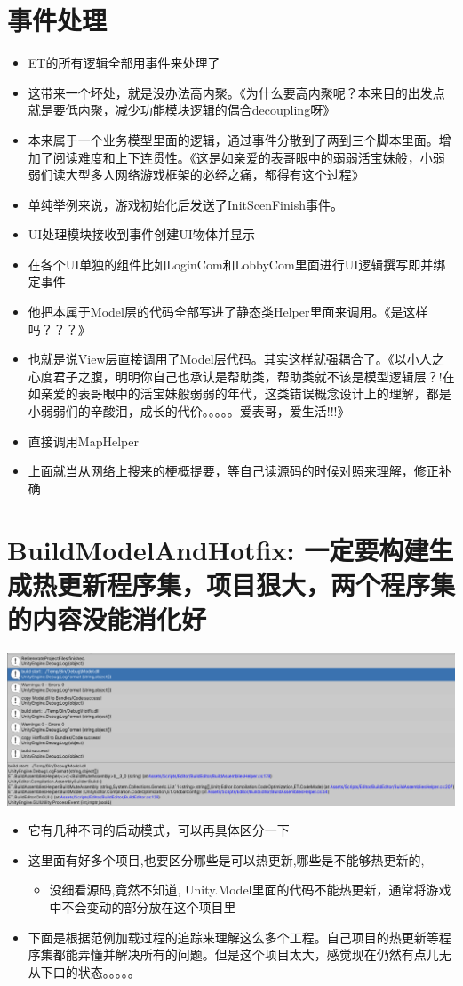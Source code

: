 \documentclass[9pt, b5paper]{article}
\begin{document}
\section{事件处理}
\label{sec-7}
\begin{itemize}
\item ET的所有逻辑全部用事件来处理了
\item 这带来一个坏处，就是没办法高内聚。《为什么要高内聚呢？本来目的出发点就是要低内聚，减少功能模块逻辑的偶合decoupling呀》
\item 本来属于一个业务模型里面的逻辑，通过事件分散到了两到三个脚本里面。增加了阅读难度和上下连贯性。《这是如亲爱的表哥眼中的弱弱活宝妹般，小弱弱们读大型多人网络游戏框架的必经之痛，都得有这个过程》
\item 单纯举例来说，游戏初始化后发送了InitScenFinish事件。
\item UI处理模块接收到事件创建UI物体并显示
\item 在各个UI单独的组件比如LoginCom和LobbyCom里面进行UI逻辑撰写即并绑定事件
\item 他把本属于Model层的代码全部写进了静态类Helper里面来调用。《是这样吗？？？》
\item 也就是说View层直接调用了Model层代码。其实这样就强耦合了。《以小人之心度君子之腹，明明你自己也承认是帮助类，帮助类就不该是模型逻辑层？!在如亲爱的表哥眼中的活宝妹般弱弱的年代，这类错误概念设计上的理解，都是小弱弱们的辛酸泪，成长的代价。。。。。爱表哥，爱生活!!!》
\item 直接调用MapHelper
\item 上面就当从网络上搜来的梗概提要，等自己读源码的时候对照来理解，修正补确
\end{itemize}
\section{BuildModelAndHotfix: 一定要构建生成热更新程序集，项目狠大，两个程序集的内容没能消化好}
\label{sec-8}

\includegraphics[width=.9\linewidth]{./pic/readme_20230125_103303.png}
\begin{itemize}
\item 它有几种不同的启动模式，可以再具体区分一下
\item 这里面有好多个项目,也要区分哪些是可以热更新,哪些是不能够热更新的,
\begin{itemize}
\item 没细看源码,竟然不知道, Unity.Model里面的代码不能热更新，通常将游戏中不会变动的部分放在这个项目里
\end{itemize}
\item 下面是根据范例加载过程的追踪来理解这么多个工程。自己项目的热更新等程序集都能弄懂并解决所有的问题。但是这个项目太大，感觉现在仍然有点儿无从下口的状态。。。。。
\end{itemize}
\end{document}
